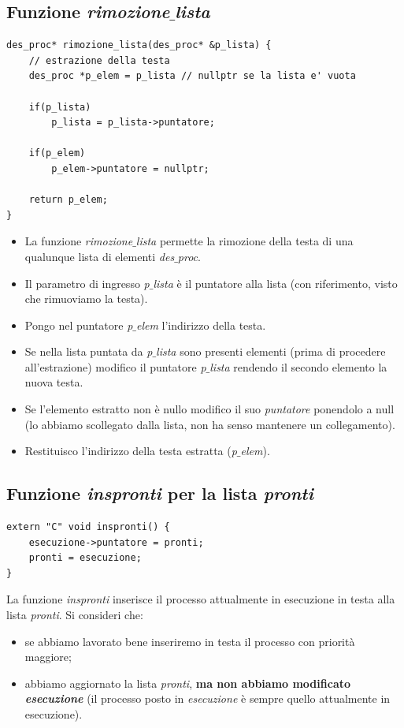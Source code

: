 \documentclass[11pt]{report}
\theoremstyle{definition}
\begin{document}
\subsection{Funzione \emph{rimozione$\_$lista}}
\small
\begin{verbatim}
des_proc* rimozione_lista(des_proc* &p_lista) {
    // estrazione della testa
    des_proc *p_elem = p_lista // nullptr se la lista e' vuota
    
    if(p_lista)
        p_lista = p_lista->puntatore;
        
    if(p_elem)
        p_elem->puntatore = nullptr;
        
    return p_elem;
}
\end{verbatim}
\normalsize
\begin{itemize}
	\item La funzione \emph{rimozione$\_$lista} permette la rimozione della testa di una qualunque lista di elementi \emph{des$\_$proc}.
	\item Il parametro di ingresso \emph{p$\_$lista} è il puntatore alla lista (con riferimento, visto che rimuoviamo la testa).
	\item Pongo nel puntatore \emph{p$\_$elem} l'indirizzo della testa.
	\item Se nella lista puntata da \emph{p$\_$lista} sono presenti elementi (prima di procedere all'estrazione) modifico il puntatore \emph{p$\_$lista} rendendo il secondo elemento la nuova testa.
	\item Se l'elemento estratto non è nullo modifico il suo \emph{puntatore} ponendolo a null (lo abbiamo scollegato dalla lista, non ha senso mantenere un collegamento).
	\item Restituisco l'indirizzo della testa estratta (\emph{p$\_$elem}).
\end{itemize}

\subsection{Funzione \emph{inspronti} per la lista \emph{pronti}}
\small
\begin{verbatim}
extern "C" void inspronti() {
    esecuzione->puntatore = pronti;
    pronti = esecuzione;
}
\end{verbatim}
\normalsize 
La funzione \emph{inspronti} inserisce il processo attualmente in esecuzione in testa alla lista \emph{pronti}. Si consideri che:
\begin{itemize}
	\item se abbiamo lavorato bene inseriremo in testa il processo con priorità maggiore;
	\item abbiamo aggiornato la lista \emph{pronti}, \textbf{ma non abbiamo modificato \emph{esecuzione}} (il processo posto in \emph{esecuzione} è sempre quello attualmente in esecuzione).
\end{itemize}
\end{document}
